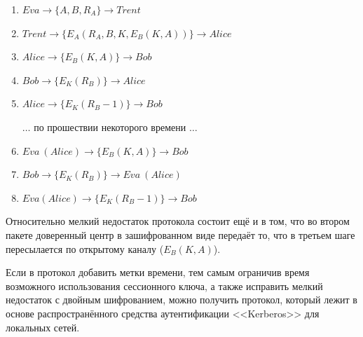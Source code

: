 \begin{enumerate}
	\item $ Eva		\rightarrow \{ A, B, R_A \}						\rightarrow Trent $
	\item $ Trent		\rightarrow \{ E_A \left( R_A, B, K, E_B \left( K, A \right) \right) \}	\rightarrow Alice $
	\item $ Alice		\rightarrow \{ E_B \left( K, A \right) \}				\rightarrow Bob $
	\item $ Bob		\rightarrow \{ E_K \left( R_B \right) \}				\rightarrow Alice $
	\item $ Alice		\rightarrow \{ E_K \left( R_B - 1 \right) \}				\rightarrow Bob $

		$\dots$ по прошествии некоторого времени $\dots$\\
	\item $ Eva~(Alice)	\rightarrow \{ E_B \left( K, A \right) \}				\rightarrow Bob $
	\item $ Bob		\rightarrow \{ E_K \left( R_B \right) \}				\rightarrow Eva~(Alice) $
	\item $ Eva (Alice)	\rightarrow \{ E_K \left( R_B - 1 \right) \}				\rightarrow Bob $
\end{enumerate}

Относительно мелкий недостаток протокола состоит ещё и в том, что во втором пакете доверенный центр в зашифрованном виде передаёт то, что в третьем шаге пересылается по открытому каналу ($E_B \left( K, A \right)$).

Если в протокол добавить метки времени, тем самым ограничив время возможного использования сессионного ключа, а также исправить мелкий недостаток с двойным шифрованием, можно получить протокол, который лежит в основе распространённого средства аутентификации <<Kerberos>> для локальных сетей.

